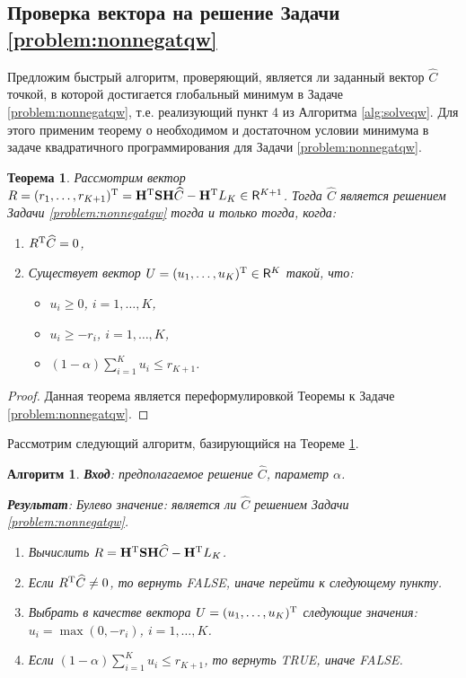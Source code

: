 \documentclass[10pt]{article}
\newtheorem{algorithm}{Алгоритм}
\newtheorem{theorem}{Теорема}
\begin{document}
\subsection{Проверка вектора на решение Задачи \ref{problem:nonnegatqw}} \label{sect:check}
Предложим быстрый алгоритм, проверяющий, является ли заданный вектор $\widehat C$ точкой, в которой достигается глобальный минимум в Задаче \ref{problem:nonnegatqw}, т.е. реализующий пункт 4 из Алгоритма \ref{alg:solveqw}. Для этого применим теорему о необходимом и достаточном условии минимума в задаче квадратичного программирования для Задачи \ref{problem:nonnegatqw}.
\begin{theorem} \label{th:nonnegatfc}
	Рассмотрим вектор $R = (r_1, \ldots, r_{K+1})^{\mathrm{T}} = \mathbf{H}^{\mathrm{T}} \mathbf{S} \mathbf{H} \widehat C - \mathbf{H}^{\mathrm{T}} L_K \in \mathsf{R}^{K+1}$. Тогда $\widehat C$ является решением Задачи \ref{problem:nonnegatqw} тогда и только тогда, когда:
	\begin{enumerate}
		\item $R^{\mathrm{T}} \widehat C = 0$,
		\item Существует вектор $U = (u_1, \ldots, u_K)^{\mathrm{T}} \in \mathsf{R}^K$ такой, что: \begin{itemize}
			\item $u_i \ge 0$, $i = 1, \ldots, K$,
			\item $u_i \ge -r_i$, $i = 1, \ldots, K$,
			\item $(1 - \alpha) \sum_{i=1}^K u_i \le r_{K+1}$.
		\end{itemize}
	\end{enumerate}
\end{theorem} 
\begin{proof}
	Данная теорема является переформулировкой  Теоремы  \cite[Теорема 9.2]{Gavurin1984} к Задаче \ref{problem:nonnegatqw}.
\end{proof}

Рассмотрим следующий алгоритм, базирующийся на Теореме \ref{th:nonnegatfc}.
\begin{algorithm}
	\label{alg:nonnegatfc}
	\textbf{Вход}: предполагаемое решение $\widehat C$, параметр $\alpha$.
	
	\textbf{Результат}:
	Булево значение: является ли $\widehat C$ решением Задачи \ref{problem:nonnegatqw}.
	
	\begin{enumerate}
		\item Вычислить $R = \mathbf{H}^{\mathrm{T}} \mathbf{S} \mathbf{H} \widehat C - \mathbf{H}^{\mathrm{T}} L_K$.
		\item Если $R^{\mathrm{T}} \widehat C \neq 0$, то вернуть FALSE, иначе перейти к следующему пункту.
		\item Выбрать в качестве вектора $U = (u_1, \ldots, u_K)^{\mathrm{T}}$ следующие значения: $u_i = \max(0, -r_i)$, $i = 1, \ldots, K$.
		\item Если $(1 - \alpha) \sum_{i=1}^K u_i \le r_{K+1}$, то вернуть TRUE, иначе FALSE.
	\end{enumerate}
\end{algorithm}
\end{document}
